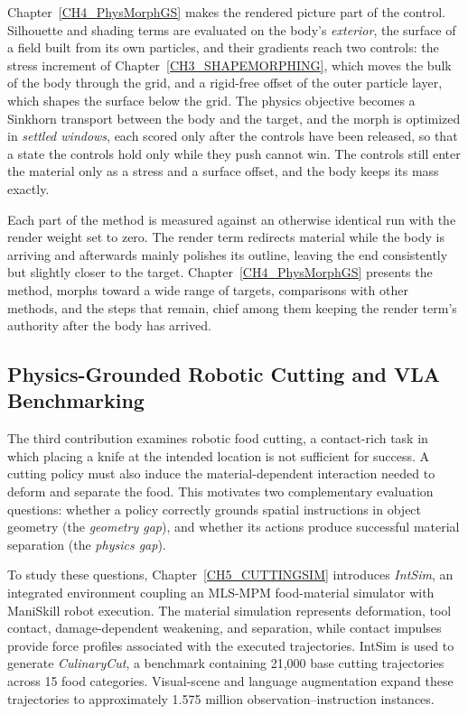     Chapter~\ref{CH4_PhysMorphGS} makes the rendered picture part of the control. Silhouette and shading terms are evaluated on the body's \emph{exterior}, the surface of a field built from its own particles, and their gradients reach two controls: the stress increment of Chapter~\ref{CH3_SHAPEMORPHING}, which moves the bulk of the body through the grid, and a rigid-free offset of the outer particle layer, which shapes the surface below the grid. The physics objective becomes a Sinkhorn transport between the body and the target, and the morph is optimized in \emph{settled windows}, each scored only after the controls have been released, so that a state the controls hold only while they push cannot win. The controls still enter the material only as a stress and a surface offset, and the body keeps its mass exactly.

    Each part of the method is measured against an otherwise identical run with the render weight set to zero. The render term redirects material while the body is arriving and afterwards mainly polishes its outline, leaving the end consistently but slightly closer to the target. Chapter~\ref{CH4_PhysMorphGS} presents the method, morphs toward a wide range of targets, comparisons with other methods, and the steps that remain, chief among them keeping the render term's authority after the body has arrived.

\subsection{Physics-Grounded Robotic Cutting and VLA Benchmarking}
\label{sec:contrib_cutting}
    The third contribution examines robotic food cutting, a contact-rich task in which placing a knife at the intended location is not sufficient for success. A cutting policy must also induce the material-dependent interaction needed to deform and separate the food. This motivates two complementary evaluation questions: whether a policy correctly grounds spatial instructions in object geometry (the \emph{geometry gap}), and whether its actions produce successful material separation (the \emph{physics gap}).
    
    To study these questions, Chapter~\ref{CH5_CUTTINGSIM} introduces \emph{IntSim}, an integrated environment coupling an MLS-MPM food-material simulator with ManiSkill robot execution. The material simulation represents deformation, tool contact, damage-dependent weakening, and separation, while contact impulses provide force profiles associated with the executed trajectories. IntSim is used to generate \emph{CulinaryCut}, a benchmark containing 21,000 base cutting trajectories across 15 food categories. Visual-scene and language augmentation expand these trajectories to approximately 1.575 million observation--instruction instances.
    
